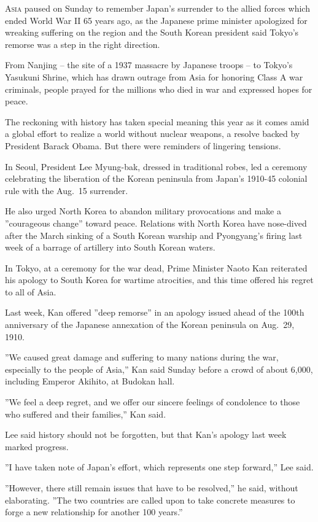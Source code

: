 ﻿\documentclass[12pt]{article}
\begin{document}
\lettrine{A}{sia} paused on Sunday to remember Japan's surrender to the
allied forces which ended World War II 65 years ago, as the Japanese prime minister apologized for
wreaking suffering on the region and the South Korean president said Tokyo's remorse was a step in
the right direction.

From Nanjing -- the site of a 1937 massacre by Japanese troops -- to Tokyo's Yasukuni Shrine, which
has drawn outrage from Asia for honoring Class A war criminals, people prayed for the millions who
died in war and expressed hopes for peace.

The reckoning with history has taken special meaning this year as it comes amid a global effort to
realize a world without nuclear weapons, a resolve backed by President Barack Obama. But there were
reminders of lingering tensions.

In Seoul, President Lee Myung-bak, dressed in traditional robes, led a ceremony celebrating the
liberation of the Korean peninsula from Japan's 1910-45 colonial rule with the Aug.~15 surrender.

He also urged North Korea to abandon military provocations and make a ''courageous change'' toward
peace. Relations with North Korea have nose-dived after the March sinking of a South Korean warship
and Pyongyang's firing last week of a barrage of artillery into South Korean waters.

In Tokyo, at a ceremony for the war dead, Prime Minister Naoto Kan reiterated his apology to South
Korea for wartime atrocities, and this time offered his regret to all of Asia.

Last week, Kan offered ''deep remorse'' in an apology issued ahead of the 100th anniversary of the
Japanese annexation of the Korean peninsula on Aug.~29, 1910.

''We caused great damage and suffering to many nations during the war, especially to the people of
Asia,'' Kan said Sunday before a crowd of about 6,000, including Emperor Akihito, at Budokan hall.

''We feel a deep regret, and we offer our sincere feelings of condolence to those who suffered and
their families,'' Kan said.

Lee said history should not be forgotten, but that Kan's apology last week marked progress.

''I have taken note of Japan's effort, which represents one step forward,'' Lee said.

''However, there still remain issues that have to be resolved,'' he said, without elaborating. ''The
two countries are called upon to take concrete measures to forge a new relationship for another 100
years.''
\end{document}
